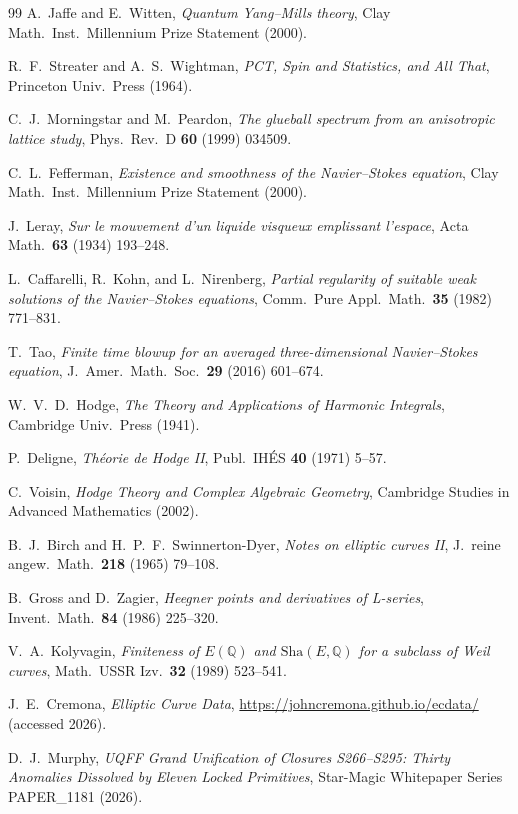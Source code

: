 \documentclass[11pt]{article}
\newcommand{\Sha}{\mathrm{Sha}}
\begin{document}
\begin{thebibliography}{99}
 A.~Jaffe and E.~Witten, \emph{Quantum Yang--Mills theory}, Clay Math.\ Inst.\ Millennium Prize Statement (2000).

 R.~F.~Streater and A.~S.~Wightman, \emph{PCT, Spin and Statistics, and All That}, Princeton Univ.\ Press (1964).

 C.~J.~Morningstar and M.~Peardon, \emph{The glueball spectrum from an anisotropic lattice study}, Phys.\ Rev.\ D \textbf{60} (1999) 034509.

 C.~L.~Fefferman, \emph{Existence and smoothness of the Navier--Stokes equation}, Clay Math.\ Inst.\ Millennium Prize Statement (2000).

 J.~Leray, \emph{Sur le mouvement d'un liquide visqueux emplissant l'espace}, Acta Math.\ \textbf{63} (1934) 193--248.

 L.~Caffarelli, R.~Kohn, and L.~Nirenberg, \emph{Partial regularity of suitable weak solutions of the Navier--Stokes equations}, Comm.\ Pure Appl.\ Math.\ \textbf{35} (1982) 771--831.

 T.~Tao, \emph{Finite time blowup for an averaged three-dimensional Navier--Stokes equation}, J.\ Amer.\ Math.\ Soc.\ \textbf{29} (2016) 601--674.

 W.~V.~D.~Hodge, \emph{The Theory and Applications of Harmonic Integrals}, Cambridge Univ.\ Press (1941).

 P.~Deligne, \emph{Th\'eorie de Hodge II}, Publ.\ IH\'ES \textbf{40} (1971) 5--57.

 C.~Voisin, \emph{Hodge Theory and Complex Algebraic Geometry}, Cambridge Studies in Advanced Mathematics (2002).

 B.~J.~Birch and H.~P.~F.~Swinnerton-Dyer, \emph{Notes on elliptic curves II}, J.\ reine angew.\ Math.\ \textbf{218} (1965) 79--108.

 B.~Gross and D.~Zagier, \emph{Heegner points and derivatives of L-series}, Invent.\ Math.\ \textbf{84} (1986) 225--320.

 V.~A.~Kolyvagin, \emph{Finiteness of $E(\mathbb{Q})$ and $\Sha(E,\mathbb{Q})$ for a subclass of Weil curves}, Math.\ USSR Izv.\ \textbf{32} (1989) 523--541.

 J.~E.~Cremona, \emph{Elliptic Curve Data}, \url{https://johncremona.github.io/ecdata/} (accessed 2026).

 D.~J.~Murphy, \emph{UQFF Grand Unification of Closures S266--S295: Thirty Anomalies Dissolved by Eleven Locked Primitives}, Star-Magic Whitepaper Series PAPER\_1181 (2026).

\end{thebibliography}
\end{document}
